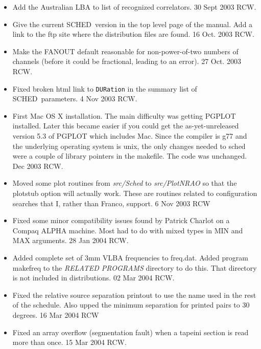 \documentclass{report}
\newcommand{\schedb}{{\sc SCHED~}}
\begin{document}
\begin{itemize}

\item  Add the Australian LBA to list of recognized correlators.
30 Sept 2003 RCW.

\item  Give the current \schedb version in the top level page
of the manual.  Add a link to the ftp site where the distribution
files are found.  16 Oct. 2003 RCW.

\item  Make the FANOUT default reasonable for non-power-of-two numbers
of channels (before it could be fractional, leading to an error).
27 Oct. 2003 RCW.

\item  Fixed broken html link to {\tt DURation} in the summary list of
\schedb parameters.  4 Nov 2003  RCW.

\item  First Mac OS X installation.  The main difficulty was getting
PGPLOT installed.  Later this became easier if you could get the
as-yet-unreleased version 5.3 of PGPLOT which includes Mac.  Since the
compiler is g77 and the underlying operating system is unix, the only
changes needed to sched were a couple of library pointers in the
makefile.  The code was unchanged.  Dec 2003 RCW.

\item Moved some plot routines from {\sl src/Sched} to {\sl
src/PlotNRAO} so that the plotstub option will actually work.  These
are routines related to configuration searches that I, rather than
Franco, support.  6 Nov 2003 RCW

\item  Fixed some minor compatibility issues found by Patrick Charlot
on a Compaq ALPHA machine.  Most had to do with mixed types in
MIN and MAX arguments.  28 Jan 2004  RCW.

\item  Added complete set of 3mm VLBA frequencies to freq.dat.  Added
program makefreq to the {\sl RELATED PROGRAMS} directory to do this.  That
directory is not included in distributions.  02 Mar 2004  RCW.

\item Fixed the relative source separation printout to use the name used
in the rest of the schedule.  Also upped the minimum separation for
printed pairs to 30 degrees.  16 Mar 2004 RCW

\item Fixed an array overflow (segmentation fault) when a tapeini
section is read more than once.  15 Mar 2004 RCW.


\end{itemize}
\end{document}
